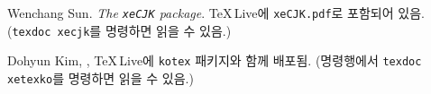 \begin{thebibliography}{99}
 Wenchang Sun.
    \newblock \emph{The \texttt{xeCJK} package}.
  \newblock \TeX\,Live에 \texttt{xeCJK.pdf}로 포함되어 있음. (\texttt{texdoc xecjk}를 명령하면 읽을 수 있음.)

 Dohyun Kim,
  \newblock {},
  \newblock \TeX\,Live에 \texttt{kotex} 패키지와 함께 배포됨. (명령행에서 \texttt{texdoc xetexko}를 명령하면 읽을 수 있음.)

\end{thebibliography}


%

